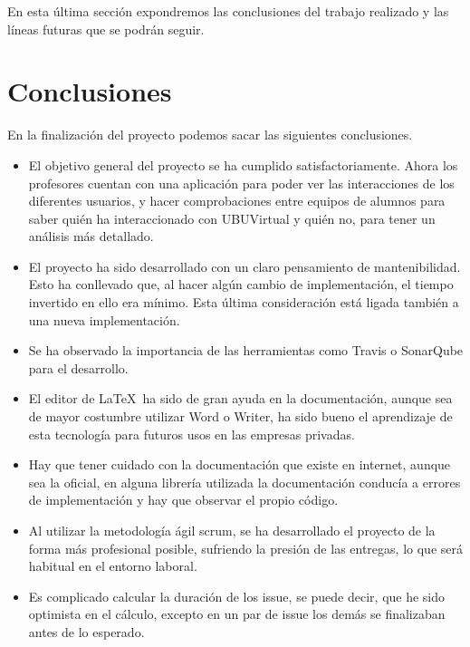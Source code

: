 
En esta última sección expondremos las conclusiones del trabajo realizado y las líneas futuras que se podrán seguir.

\section{Conclusiones}\label{conclusiones}

En la finalización del proyecto podemos sacar las siguientes conclusiones.

\begin{itemize}
	\tightlist
	\item
	El objetivo general del proyecto se ha cumplido satisfactoriamente.
	Ahora los profesores cuentan con una aplicación para poder ver las interacciones de los diferentes usuarios, y hacer comprobaciones entre equipos de alumnos para saber quién ha interaccionado con UBUVirtual y quién no, para tener un análisis más detallado.
	\item
	El proyecto ha sido desarrollado con un claro pensamiento de mantenibilidad. Esto ha conllevado que, al hacer algún cambio de implementación, el tiempo invertido en ello era mínimo. Esta última consideración está ligada también a una nueva implementación.
	\item
	Se ha observado la importancia de las herramientas como Travis o SonarQube para el desarrollo.
	\item
	El editor de \LaTeX\ ha sido de gran ayuda en la documentación, aunque sea de mayor costumbre utilizar Word o Writer, ha sido bueno el aprendizaje de esta tecnología para futuros usos en las empresas privadas.
	\item
	Hay que tener cuidado con la documentación que existe en internet, aunque sea la oficial, en alguna librería utilizada la documentación conducía a errores de implementación y hay que observar el propio código.
	\item
	Al utilizar la metodología ágil scrum, se ha desarrollado el proyecto de la forma más profesional posible, sufriendo la presión de las entregas, lo que será habitual en el entorno laboral.
	\item
	Es complicado calcular la duración de los issue, se puede decir, que he sido optimista en el cálculo, excepto en un par de issue los demás se finalizaban antes de lo esperado.
	
\end{itemize}


